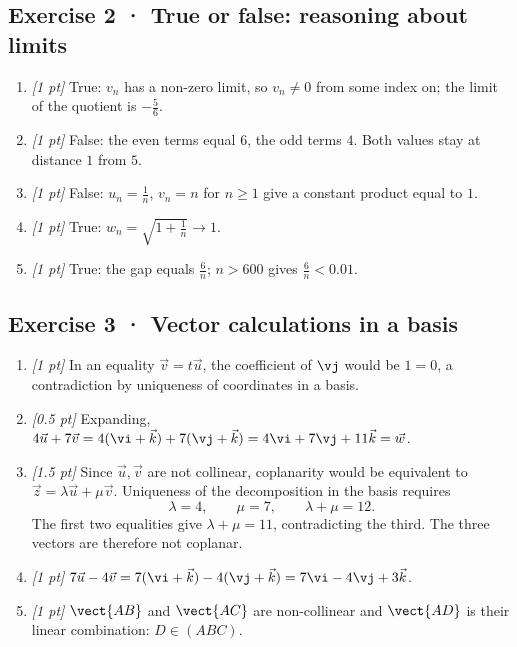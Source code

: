 \subsection*{Exercise 2 · True or false: reasoning about limits}\begin{enumerate}

\item \textit{[1 pt]} True: $v_n$ has a non-zero limit, so $v_n\ne0$ from some index on; the limit of the quotient is $-\frac{5}{6}$.

\item \textit{[1 pt]} False: the even terms equal $6$, the odd terms $4$. Both values stay at distance $1$ from $5$.

\item \textit{[1 pt]} False: $u_n=\frac{1}{n}$, $v_n=n$ for $n\ge1$ give a constant product equal to $1$.

\item \textit{[1 pt]} True: $w_n=\sqrt{1+\frac{1}{n}}\to1$.

\item \textit{[1 pt]} True: the gap equals $\frac{6}{n}$; $n>600$ gives $\frac{6}{n}<\num{0,01}$.

\end{enumerate}

\subsection*{Exercise 3 · Vector calculations in a basis}\begin{enumerate}

\item \textit{[1 pt]} In an equality $\vec v=t\vec u$, the coefficient of $\vj $ would be $1=0$, a contradiction by uniqueness of coordinates in a basis.

\item \textit{[0.5 pt]} Expanding, $4\vec u+7\vec v=4(\vi +\vec k)+7(\vj +\vec k)=4\vi +7\vj +11\vec k=\vec w$.

\item \textit{[1.5 pt]} Since $\vec u,\vec v$ are not collinear, coplanarity would be equivalent to $\vec z=\lambda\vec u+\mu\vec v$. Uniqueness of the decomposition in the basis requires
\[\lambda=4,\qquad\mu=7,\qquad\lambda+\mu=12.\]
The first two equalities give $\lambda+\mu=11$, contradicting the third. The three vectors are therefore not coplanar.

\item \textit{[1 pt]} $7\vec u-4\vec v=7(\vi +\vec k)-4(\vj +\vec k)=7\vi -4\vj +3\vec k$.

\item \textit{[1 pt]} $\vect{AB}$ and $\vect{AC}$ are non-collinear and $\vect{AD}$ is their linear combination: $D\in(ABC)$.

\end{enumerate}

